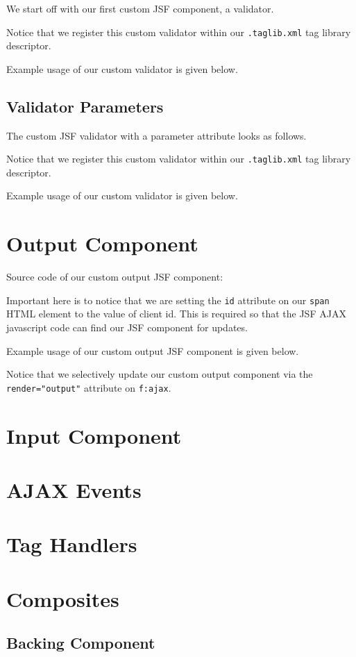 We start off with our first custom JSF component, a validator.


Notice that we register this custom validator within our \texttt{.taglib.xml} tag library descriptor.

Example usage of our custom validator is given below.


\subsection{Validator Parameters}

The custom JSF  validator with a parameter attribute looks as follows.


Notice that we register this custom validator within our \texttt{.taglib.xml} tag library descriptor.

Example usage of our custom validator is given below.


\section{Output Component}

Source code of our custom output JSF component:


Important here is to notice that we are setting the \texttt{id} attribute on our \texttt{span} HTML element to the value of client id.
This is required so that the JSF AJAX javascript code can find our JSF component for updates.

Example usage of our custom output JSF component is given below.


Notice that we selectively update our custom output component via the \texttt{render="output"} attribute on \texttt{f:ajax}.

\section{Input Component}

\section{AJAX Events}

\section{Tag Handlers}

\section{Composites}

\subsection{Backing Component}